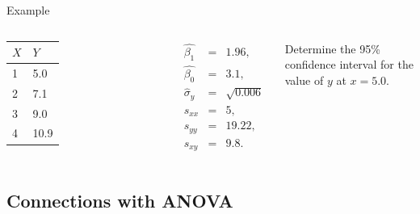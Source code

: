 \begin{frame}{Example}

    \begin{columns}

      \begin{tabular}{l|l}
        $X$ & $Y$ \\ \hline
        1 & 5.0 \\
        2 & 7.1 \\
        3 & 9.0 \\
        4 & 10.9 \\
      \end{tabular}


      \begin{eqnarray*}
        \hat{\beta_1} & = & 1.96, \\
        \hat{\beta_0} & = & 3.1, \\
        \hat{\sigma}_y & = & \sqrt{0.006} \\
        s_{xx} & = & 5, \\
        s_{yy} & = & 19.22, \\
        s_{xy} & = & 9.8. 
      \end{eqnarray*}



      Determine the 95\% confidence interval for the value of $y$ at $x=5.0$.

    \end{columns}



\end{frame}

\subsection{Connections with ANOVA}

